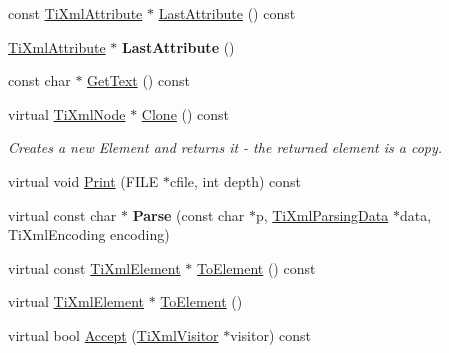 \begin{DoxyCompactItemize}
\item 
const \hyperlink{class_ti_xml_attribute}{\-Ti\-Xml\-Attribute} $\ast$ \hyperlink{class_ti_xml_element_a86191b49f9177be132b85b14655f1381}{\-Last\-Attribute} () const 
\item 
\hypertarget{class_ti_xml_element_a222f81cf06155cd108f2a68d4d176004}{
\hyperlink{class_ti_xml_attribute}{\-Ti\-Xml\-Attribute} $\ast$ {\bfseries \-Last\-Attribute} ()}
\label{class_ti_xml_element_a222f81cf06155cd108f2a68d4d176004}

\item 
const char $\ast$ \hyperlink{class_ti_xml_element_aa6dedd8a146acf3b1bc0903deb2d411a}{\-Get\-Text} () const 
\item 
\hypertarget{class_ti_xml_element_a13f6df105ebb1e8dc636e75cc883be32}{
virtual \hyperlink{class_ti_xml_node}{\-Ti\-Xml\-Node} $\ast$ \hyperlink{class_ti_xml_element_a13f6df105ebb1e8dc636e75cc883be32}{\-Clone} () const }
\label{class_ti_xml_element_a13f6df105ebb1e8dc636e75cc883be32}

\begin{DoxyCompactList}\small\item\em \-Creates a new \-Element and returns it -\/ the returned element is a copy. \end{DoxyCompactList}\item 
virtual void \hyperlink{class_ti_xml_element_ad9d0c008866982ab8d9aafae7e14d692}{\-Print} (\-F\-I\-L\-E $\ast$cfile, int depth) const 
\item 
\hypertarget{class_ti_xml_element_af95c9165159fd9dfdcc5b894a3fcf85b}{
virtual const char $\ast$ {\bfseries \-Parse} (const char $\ast$p, \hyperlink{class_ti_xml_parsing_data}{\-Ti\-Xml\-Parsing\-Data} $\ast$data, \-Ti\-Xml\-Encoding encoding)}
\label{class_ti_xml_element_af95c9165159fd9dfdcc5b894a3fcf85b}

\item 
virtual const \hyperlink{class_ti_xml_element}{\-Ti\-Xml\-Element} $\ast$ \hyperlink{class_ti_xml_element_ac5b8d0e25fa23fd9acbb6d146082901c}{\-To\-Element} () const 
\item 
virtual \hyperlink{class_ti_xml_element}{\-Ti\-Xml\-Element} $\ast$ \hyperlink{class_ti_xml_element_a9def86337ea7a755eb41cac980f60c7a}{\-To\-Element} ()
\item 
virtual bool \hyperlink{class_ti_xml_element_a31ab28cc3b892a69254391d6bbe08df3}{\-Accept} (\hyperlink{class_ti_xml_visitor}{\-Ti\-Xml\-Visitor} $\ast$visitor) const 
\end{DoxyCompactItemize}
